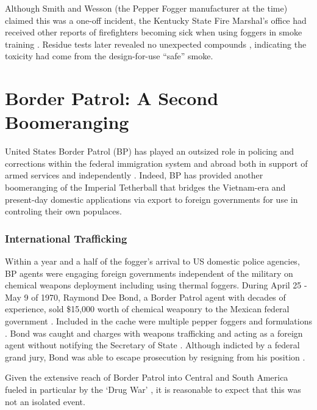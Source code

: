 \documentclass[
  12pt,
]{krantz}
\begin{document}
Although Smith and Wesson (the Pepper Fogger manufacturer at the time) claimed this was a one-off incident, the Kentucky State Fire Marshal's office had received other reports of firefighters becoming sick when using foggers in smoke training \citep{Judd1981}.
Residue tests later revealed no unexpected compounds \citep{TheCourierJournal1982_01_10}, indicating the toxicity had come from the design-for-use ``safe'' smoke.

\hypertarget{border-patrol-a-second-boomeranging}{%
\chapter*{Border Patrol: A Second Boomeranging}\label{border-patrol-a-second-boomeranging}}


United States Border Patrol (BP) has played an outsized role in policing and corrections within the federal immigration system and abroad both in support of armed services and independently \citep{Miller2019}.
Indeed, BP has provided another boomeranging of the Imperial Tetherball that bridges the Vietnam-era and present-day domestic applications via export to foreign governments for use in controling their own populaces.

\hypertarget{international-trafficking}{%
\subsection*{International Trafficking}\label{international-trafficking}}


Within a year and a half of the fogger's arrival to US domestic police agencies, BP agents were engaging foreign governments independent of the military on chemical weapons deployment including using thermal foggers.
During April 25 - May 9 of 1970, Raymond Dee Bond, a Border Patrol agent with decades of experience, sold \$15,000 worth of chemical weaponry to the Mexican federal government \citep{ValleyMorningStar1973_08_04}.
Included in the cache were multiple pepper foggers and formulations \citep{ValleyMorningStar1973_08_04}.
Bond was caught and charges with weapons trafficking and acting as a foreign agent without notifying the Secretary of State \citep{DailyNews1972_10_27}.
Although indicted by a federal grand jury, Bond was able to escape prosecution by resigning from his position \citep{ValleyMorningStar1973_08_04}.

Given the extensive reach of Border Patrol into Central and South America fueled in particular by the `Drug War' \citep{Chepesiuk1999}, it is reasonable to expect that this was not an isolated event.
\end{document}
